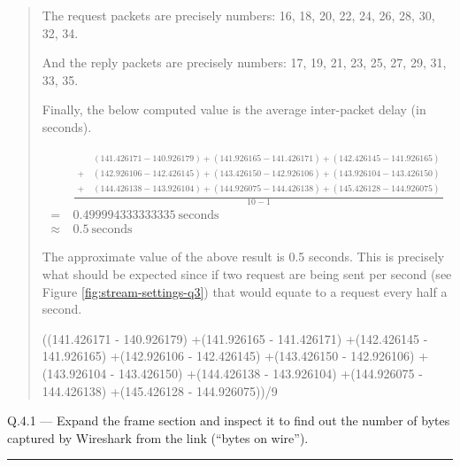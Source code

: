 \documentclass{article}
\newcommand\Que[2]{%
\begin{samepage}
\leavevmode\par
\noindent
Q.#1 --- #2\par\vspace{10pt}\hrule\vspace{10pt}
\end{samepage}}
\newenvironment{ans}
{\fbox{Answer}\begin{quote}\nopagebreak}
{\end{quote}}
\begin{document}
\begin{ans}
The request packets are precisely numbers: 16, 18, 20, 22,
24, 26, 28, 30, 32, 34.

And the reply packets are precisely numbers: 17, 19, 21,
23, 25, 27, 29, 31, 33, 35.

Finally, the below computed value is the average
inter-packet delay (in seconds).

$$
\begin{aligned}
          & \frac{
\begin{aligned}
    & (141.426171 - 140.926179)
+(141.926165 - 141.426171)
+(142.426145 - 141.926165)      \\
+\  & (142.926106 - 142.426145)
+(143.426150 - 142.926106)
+(143.926104 - 143.426150)      \\
+\  & (144.426138 - 143.926104)
+(144.926075 - 144.426138)
+(145.426128 - 144.926075)
\end{aligned}
}{10 - 1}                                     \\
=\        & 0.499994333333335\ \text{seconds} \\
\approx\  & 0.5\ \text{seconds}
\end{aligned}
$$

The approximate value of the above result is 0.5 seconds. This
is precisely what should be expected since if two request are
being sent per second (see Figure \ref{fig:stream-settings-q3})
that would equate to a request every half a second.

\begin{gruvboxlisting}[language=Python,caption={Python
expression for calculating the inter-packet delay for
Question 3.}]
((141.426171 - 140.926179)
+(141.926165 - 141.426171)
+(142.426145 - 141.926165)
+(142.926106 - 142.426145)
+(143.426150 - 142.926106)
+(143.926104 - 143.426150)
+(144.426138 - 143.926104)
+(144.926075 - 144.426138)
+(145.426128 - 144.926075))/9
\end{gruvboxlisting}
\end{ans}

\Que{4.1}{Expand the frame section and inspect it to find out
the number of bytes captured by Wireshark from the link (``bytes
on wire'').}
\end{document}
